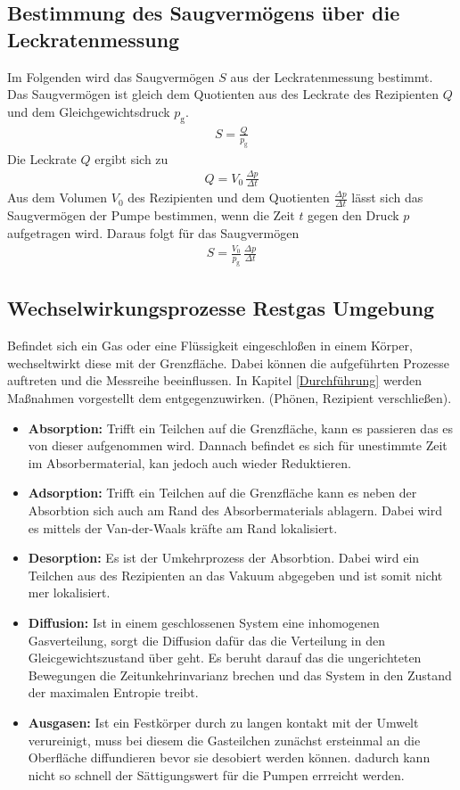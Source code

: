 \subsection{Bestimmung des Saugvermögens über die Leckratenmessung}
Im Folgenden wird das Saugvermögen $S$ aus der Leckratenmessung bestimmt. Das Saugvermögen ist gleich dem Quotienten aus des Leckrate des Rezipienten $Q$ und dem Gleichgewichtsdruck $p_\text{g}$.
\begin{align}
   S = \frac{Q}{p_\text{g}}
\end{align}
Die Leckrate $Q$ ergibt sich zu
\begin{align}
   Q = V_0\, \frac{\Delta p}{\Delta t}
\end{align}
Aus dem Volumen $V_0$ des Rezipienten und dem Quotienten $\frac{\Delta p}{\Delta t}$ lässt sich das Saugvermögen der Pumpe bestimmen, wenn die Zeit $t$ gegen den Druck $p$ aufgetragen wird. Daraus folgt für das Saugvermögen
\begin{align}\label{eqn:SaugLeck}
   S = \frac{V_0}{p_\text{g}}\, \frac{\Delta p}{\Delta t}
\end{align}
\subsection{Wechselwirkungsprozesse Restgas Umgebung}
Befindet sich ein Gas oder eine Flüssigkeit eingeschloßen in einem Körper, wechseltwirkt diese mit der Grenzfläche. Dabei können die aufgeführten Prozesse auftreten und die Messreihe beeinflussen. In Kapitel \ref{Durchführung} werden Maßnahmen vorgestellt dem entgegenzuwirken. (Phönen, Rezipient verschließen).
\begin{itemize}
  \item \textbf{Absorption:} Trifft ein Teilchen auf die Grenzfläche, kann es passieren das es von dieser aufgenommen wird. Dannach befindet es sich für unestimmte Zeit im Absorbermaterial, kan jedoch auch wieder Reduktieren.
  \item \textbf{Adsorption:} Trifft ein Teilchen auf die Grenzfläche kann es neben der Absorbtion sich auch am Rand des Absorbermaterials ablagern. Dabei wird es mittels der Van-der-Waals kräfte am Rand lokalisiert.
  \item \textbf{Desorption:} Es ist der Umkehrprozess der Absorbtion. Dabei wird ein Teilchen aus des Rezipienten an das Vakuum abgegeben und ist somit nicht mer lokalisiert. 
  \item \textbf{Diffusion:} Ist in einem geschlossenen System eine inhomogenen Gasverteilung, sorgt die Diffusion dafür das die Verteilung in den Gleicgewichtszustand über geht. Es beruht darauf das die ungerichteten Bewegungen die Zeitunkehrinvarianz brechen und das System in den Zustand der maximalen Entropie treibt.
  \item \textbf{Ausgasen:} Ist ein Festkörper durch zu langen kontakt mit der Umwelt verureinigt, muss bei diesem die Gasteilchen zunächst ersteinmal an die Oberfläche diffundieren bevor sie desobiert werden können. dadurch kann nicht so schnell der Sättigungswert für die Pumpen errreicht werden.
\end{itemize}

